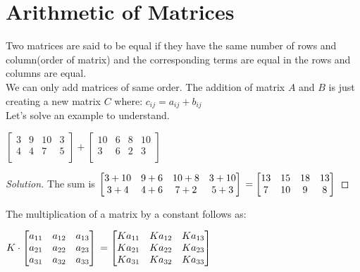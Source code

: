 \section{Arithmetic of Matrices}
Two matrices are said to be equal if they have the same number of rows and column(order of matrix) and the corresponding terms are equal in the rows and columns are equal.\\
We can only add matrices of same order. The addition of matrix $A$ and $B$ is just creating a new matrix $C$ where: $c_{ij}=a_{ij}+b_{ij}$\\
Let's solve an example to understand.
\begin{example}
    $\begin{bmatrix}
        3 &9 &10 &3\\
        4 &4 &7 &5\\
    \end{bmatrix}+ \begin{bmatrix}
        10 &6 &8 &10\\
        3 &6 &2 &3\\
    \end{bmatrix}$
\end{example}
\begin{proof}
    [Solution]
    The sum is $\begin{bmatrix}
        3+10 & 9+6 & 10+8 & 3+10\\
        3+4 & 4+6 & 7+2 & 5+3\\
    \end{bmatrix}\\
    = \begin{bmatrix}
        13 & 15 & 18 & 13\\
        7 & 10 & 9 & 8\\
    \end{bmatrix}$
\end{proof}
The multiplication of a matrix by a constant follows as:\\
\begin{definition}
    $K \cdot \begin{bmatrix}
        a_{11} & a_{12} & a_{13}\\
        a_{21} & a_{22} & a_{23}\\
        a_{31} & a_{32} & a_{33}\\
    \end{bmatrix}\\
    = \begin{bmatrix}
        Ka_{11} & Ka_{12} & Ka_{13}\\
        Ka_{21} & Ka_{22} & Ka_{23}\\
        Ka_{31} & Ka_{32} & Ka_{33}\\
    \end{bmatrix}$
\end{definition}
